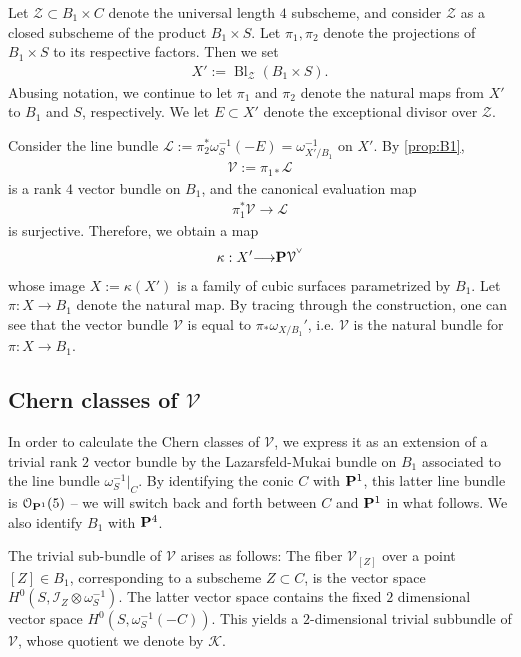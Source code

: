 \documentclass[12pt,reqno]{amsart}
\DeclareMathOperator{\Bl}{Bl}
\renewcommand{\to}{{\longrightarrow}}
\numberwithin{equation}{section}
\renewcommand{\O}{\mathcal O}
\newcommand{\V}{\mathcal V}
\newcommand{\smvee}{\raise0.5ex\hbox{$\scriptscriptstyle\vee$}}
\begin{document}
Let $\mathcal{Z} \subset B_1 \times C$ denote the universal
length $4$ subscheme, and consider $\mathcal{Z}$ as a closed subscheme
of the product $B_1 \times S$. Let $\pi_{1}, \pi_{2}$ denote the
projections of $B_1 \times S$ to its respective factors.
Then we set
\begin{align}
  \label{eq:X1}
  X' := \Bl_{\mathcal{Z}} \left( B_1 \times S \right).
\end{align}
Abusing notation, we continue to let $\pi_{1}$ and $\pi_{2}$ denote
the natural maps from $X'$ to $B_1$ and $S$, respectively.  We
let $E \subset X'$ denote the exceptional divisor over $\mathcal{Z}$.


Consider the line bundle
$\mathcal{L} := \pi_{2}^{*}\omega_{S}^{-1} (-E) =
\omega_{X'/B_{1}}^{-1}$ on $X'$.  By \autoref{prop:B1},
\begin{align}
  \label{eq:V1}
  \V := \pi_{1 *}\mathcal{L}
\end{align}
is a rank $4$ vector bundle on $B_1$, and the canonical evaluation map
\begin{align}
  \label{eq:eval1}
  \pi_{1}^{*}\V \to \mathcal{L}
\end{align}
is surjective.  Therefore, we obtain a map
\begin{align}
  \label{eq:X11}
  \kappa: X' \to \P \V^{\smvee}
\end{align}
whose image $X := \kappa(X')$ is a family of cubic surfaces
parametrized by $B_1$.  Let $\pi: X \to B_1$ denote the natural map.
By tracing through the construction, one can see that the vector
bundle $\V$ is equal to $\pi_{*} \omega_{X/B_1}'$, i.e. $\V$ is the
natural bundle for $\pi: X \to B_1$.

\subsection{Chern classes of $\V$}
\label{sec:chern-classes-b_1}

In order to calculate the Chern classes of $\V$, we express it as an
extension of a trivial rank $2$ vector bundle by the Lazarsfeld-Mukai
bundle on $B_1$ associated to the line bundle
$\omega_{S}^{-1}|_{C}$. By identifying the conic $C$ with $\P^{1}$,
this latter line bundle is $\O_{\P^{1}}(5)$ -- we will switch back and
forth between $C$ and $\P^{1}$ in what follows.  We also identify
$B_{1}$ with $\P^{4}$.


The trivial sub-bundle of $\V$ arises as follows: The fiber $\V_{[Z]}$
over a point $[Z] \in B_1$, corresponding to a subscheme
$Z \subset C$, is the vector space
$H^{0}(S, \mathcal{I}_{Z} \otimes \omega_{S}^{-1})$.  The latter
vector space contains the fixed $2$ dimensional vector space
$H^{0}(S, \omega_{S}^{-1}(-C))$.  This yields a $2$-dimensional
trivial subbundle of $\V$, whose quotient we denote by $\mathcal{K}$.
\end{document}
